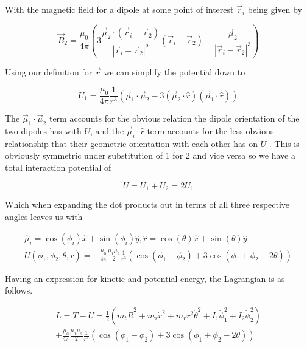 \documentclass[prb,preprint]{revtex4-1}
\begin{document}
With the magnetic field for a dipole at some point of interest $\vec r_i$ being given by

\begin{equation}
\vec B_2 = 
\frac{\mu_0}{4\pi}(
	3\frac{\vec \mu_2 \cdot (\vec r_i - \vec r_2)}{|\vec r_i - \vec r_2|^5}(
	\vec r_i - \vec r_2
	)
	-\frac{\vec \mu_2}{|\vec r_i - \vec r_2|^3}
)
\end{equation}

Using our definition for $\vec r$ we can simplify the potential down to

\begin{equation}
U_1 = 
\frac{\mu_0}{4\pi}
\frac{1}{r^3}(
	\vec \mu_1 \cdot \vec \mu_2
	-3(
		\vec \mu_2 \cdot \hat r
		)(
		\vec \mu_1 \cdot \hat r		
		)
)
\end{equation}

The $\vec \mu_1 \cdot \vec \mu_2$ term accounts for the obvious relation the dipole orientation of the two dipoles has with $U$, and the $\vec \mu_i \cdot \hat r$ term accounts for the less obvious relationship that their geometric orientation with each other has on $U$ .
This is obviously symmetric under substitution of 1 for 2 and vice versa so we have a total interaction potential of

\begin{equation}
U =
U_1+U_2
= 
2U_1
\end{equation}

Which when expanding the dot products out in terms of all three respective angles leaves us with

\begin{equation}
  \begin{multlined}
\hat \mu_i =  \cos(\phi_i)\hat x + \sin(\phi_i)\hat y,
\hat r =  \cos(\theta)\hat x + \sin(\theta)\hat y
\\
U(\phi_1, \phi_2, \theta, r) =
-\frac{\mu_0}{4\pi}
\frac{\mu_1 \mu_2}{2}
\frac{1}{r^3}(
	\cos(\phi_1-\phi_2)
	+3\cos(\phi_1+\phi_2 -2\theta)
)
  \end{multlined}
\end{equation}

Having an expression for kinetic and potential energy, the Lagrangian is as follows.

\begin{equation}
  \begin{multlined}
    L=T-U=
    \frac{1}{2}(
        m_t \dot R^2
        +m_r \dot r^2
        +m_r r^2 \dot \theta^2
        + I_1 \dot \phi_1^2
        + I_2 \dot \phi_2^2
    )
    \\
    +
    \frac{\mu_0}{4\pi}
    \frac{\mu_1 \mu_2}{2}
    \frac{1}{r^3}(
        \cos(\phi_1-\phi_2)
        +3\cos(\phi_1+\phi_2 -2\theta)
    )
  \end{multlined}
\end{equation}
\end{document}
